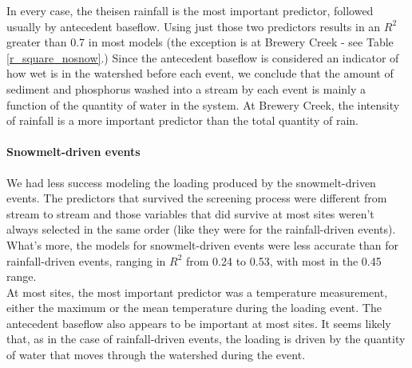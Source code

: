 \documentclass[12pt]{article}
\begin{document}
In every case, the theisen rainfall is the most important predictor, followed usually by antecedent baseflow. Using just those two predictors results in an $R^2$ greater than 0.7 in most models (the exception is at Brewery Creek - see Table \ref{r_square_nosnow}.) Since the antecedent baseflow is considered an indicator of how wet is in the watershed before each event, we conclude that the amount of sediment and phosphorus washed into a stream by each event is mainly a function of the quantity of water in the system. At Brewery Creek, the intensity of rainfall is a more important predictor than the total quantity of rain.\\

\paragraph{Snowmelt-driven events} We had less success modeling the loading produced by the snowmelt-driven events. The predictors that survived the screening process were different from stream to stream and those variables that did survive at most sites weren't always selected in the same order (like they were for the rainfall-driven events). What's more, the models for snowmelt-driven events were less accurate than for rainfall-driven events, ranging in $R^2$ from 0.24 to 0.53, with most in the 0.45 range.\\

At most sites, the most important predictor was a temperature measurement, either the maximum or the mean temperature during the loading event. The antecedent baseflow also appears to be important at most sites. It seems likely that, as in the case of rainfall-driven events, the loading is driven by the quantity of water that moves through the watershed during the event.
\end{document}
